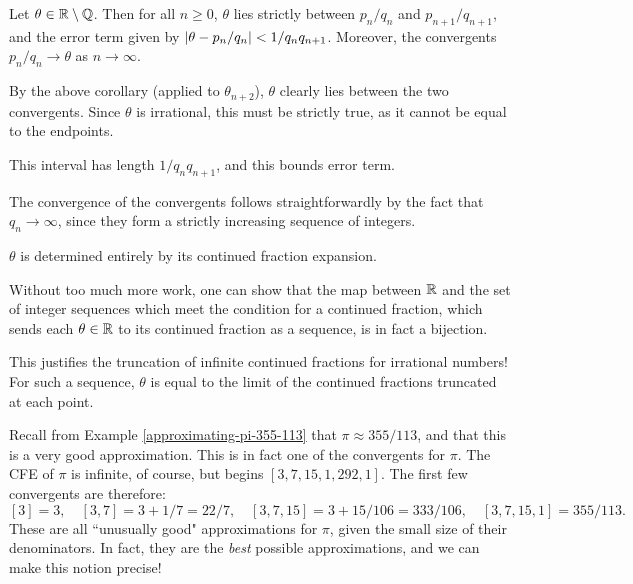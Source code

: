 \documentclass{article}
\begin{document}
\begin{theorem}
	\label{irrational-continued-fractions-theorem}
    Let $\theta \in \mathbb{R} \setminus \mathbb{Q}$. Then for all $n \geq 0$, $\theta$ lies strictly between $p_n/q_n$ and $p_{n+1}/q_{n+1}$, and the error term given by $\left\lvert \theta - p_n/q_n \right\rvert < 1/q_nq_{n+1}$. Moreover, the convergents $p_n/q_n \to \theta$ as $n \to \infty$.
\end{theorem}

\begin{prf}
    By the above corollary (applied to $\theta_{n+2}$), $\theta$ clearly lies between the two convergents. Since $\theta$ is irrational, this must be strictly true, as it cannot be equal to the endpoints.
    
    This interval has length $1/q_{n}q_{n+1}$, and this bounds error term.
    
    The convergence of the convergents follows straightforwardly by the fact that $q_n \to \infty$, since they form a strictly increasing sequence of integers.
\end{prf}

\begin{corollary}
    $\theta$ is determined entirely by its continued fraction expansion.
\end{corollary}

\begin{corollary}
    Without too much more work, one can show that the map between $\mathbb{R}$ and the set of integer sequences which meet the condition for a continued fraction, which sends each $\theta \in \mathbb{R}$ to its continued fraction as a sequence, is in fact a bijection.
\end{corollary}
 
\begin{note}
	This justifies the truncation of infinite continued fractions for irrational numbers! For such a sequence, $\theta$ is equal to the limit of the continued fractions truncated at each point.
\end{note}

Recall from Example \ref{approximating-pi-355-113} that $\pi \approx 355/113$, and that this is a very good approximation. This is in fact one of the convergents for $\pi$. The CFE of $\pi$ is infinite, of course, but begins $[3, 7, 15, 1, 292, 1]$. The first few convergents are therefore:
\[
[3] = 3, \quad
[3, 7] = 3 + 1/7 = 22/7, \quad
[3, 7, 15] = 3 + 15/106 = 333/106, \quad
[3, 7, 15, 1] = 355/113.
\]
These are all ``unusually good" approximations for $\pi$, given the small size of their denominators. In fact, they are the \textit{best} possible approximations, and we can make this notion precise!
\end{document}
